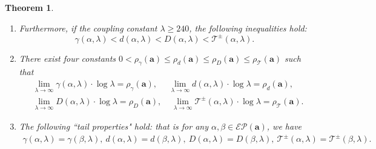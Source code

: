 \documentclass[reqno,11pt,graphicx,]{amsart}
\numberwithin{equation}{section}
\theoremstyle{plain}
\newcommand{\3}{\mathbf{3}}
\newcommand{\ma}{\mathbf{a}}
\newtheorem{theorem}{Theorem}[section]
\begin{document}
\begin{theorem}
\begin{enumerate}[label=(\roman*)]
\begin{equation}
			\end{equation}
			\item Furthermore, if the coupling constant $\lambda\geq240$,  the following inequalities hold:
			\begin{equation}\label{5}
				\gamma(\alpha,\lambda)<d(\alpha,\lambda)<D(\alpha,\lambda)<\mathcal{T}^{\pm}(\alpha,\lambda).
			\end{equation}
			\item There exist four constants $0<\rho_{\gamma}(\ma)\leq\rho_{d}(\ma)\leq\rho_{D}(\ma)\leq\rho_{\mathcal{T}}(\ma)$ such that 
			\begin{align}
				&\lim_{\lambda\to\infty}\gamma(\alpha,\lambda)\cdot\log\lambda=\rho_{\gamma}(\ma),\ \ \ \ \ \ \lim_{\lambda\to\infty}d(\alpha,\lambda)\cdot\log\lambda=\rho_{d}(\ma),\label{6}\\
				&\lim_{\lambda\to\infty}D(\alpha,\lambda)\cdot\log\lambda=\rho_{D}(\ma),\ \ \ \  \  \lim_{\lambda\to\infty}\mathcal{T}^{\pm}(\alpha,\lambda)\cdot\log\lambda=\rho_{\mathcal{T}}(\ma).\label{7}
			\end{align}
			
			\item The following ``tail properties" hold: that is for any $\alpha,\beta\in\mathcal{EP}(\ma)$, we have
			\begin{align}\label{8}
				\gamma(\alpha,\lambda)=\gamma(\beta,\lambda),\   d(\alpha,\lambda)=d(\beta,\lambda), \ 
				D(\alpha,\lambda)=D(\beta,\lambda),\  \mathcal{T}^{\pm}(\alpha,\lambda)=\mathcal{T}^{\pm}(\beta,\lambda). 
			\end{align}
		\end{enumerate}
	\end{theorem}
\end{document}
